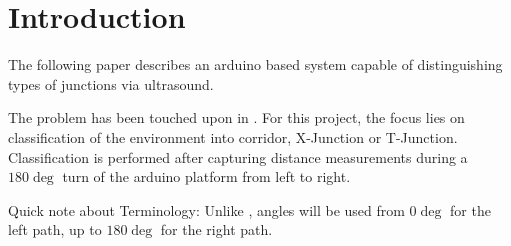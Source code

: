 \section{Introduction}
The following paper describes an arduino based system capable of distinguishing types of junctions via ultrasound.

The problem has been touched upon in \cite{article}. For this project, the focus lies on classification of the environment into corridor, X-Junction or T-Junction. Classification is performed after capturing distance measurements during a $180\deg$ turn of the arduino platform from left to right.

Quick note about Terminology: Unlike \cite{article}, angles will be used from $0\deg$ for the left path, up to $180\deg$ for the right path.